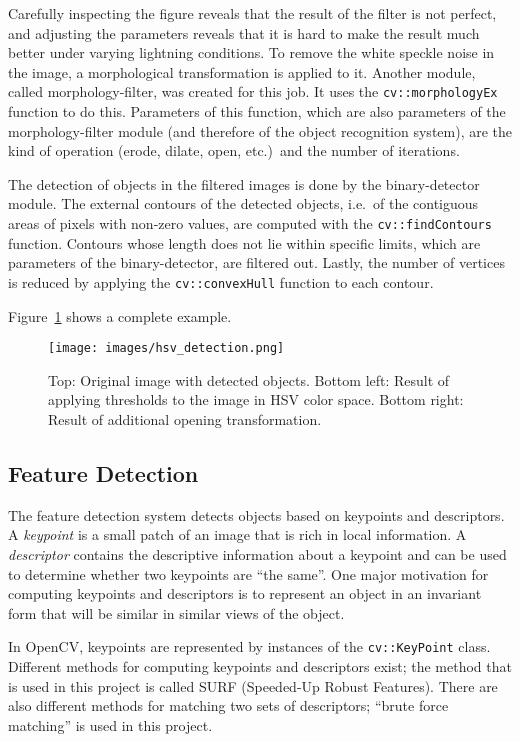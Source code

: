 \documentclass{article}
\newcommand{\code}[1]{\texttt{#1}}
\begin{document}
Carefully inspecting the figure reveals that the result of the filter is not perfect,
and adjusting the parameters reveals
that it is hard to make the result much better under varying lightning conditions.
To remove the white speckle noise in the image,
a morphological transformation is applied to it.
Another module, called morphology-filter, was created for this job.
It uses the \code{cv::morphologyEx} function to do this.
Parameters of this function, which are also parameters of the morphology-filter module
(and therefore of the object recognition system),
are the kind of operation (erode, dilate, open, etc.)\ and the number of iterations.

The detection of objects in the filtered images is done by the binary-detector
module.
The external contours of the detected objects,
i.e.\ of the contiguous areas of pixels with non-zero values,
are computed with the \code{cv::findContours} function.
Contours whose length does not lie within specific limits,
which are parameters of the binary-detector,
are filtered out.
Lastly, the number of vertices is reduced by applying the
\code{cv::convexHull} function to each contour.

Figure~\ref{fig:hsv_morph_bin} shows a complete example.
\begin{figure}
	\centering
	\texttt{[image: images/hsv\_detection.png]}
	\caption{Top: Original image with detected objects.
	Bottom left: Result of applying thresholds to the image in HSV color space.
	Bottom right: Result of additional opening transformation.}
	\label{fig:hsv_morph_bin}
\end{figure}



\subsection{Feature Detection}
\label{sec:feature_det}

The feature detection system detects objects based on keypoints and descriptors.
A \emph{keypoint} is a small patch of an image that is rich in local information.
A \emph{descriptor} contains the descriptive information about a keypoint and can be used
to determine whether two keypoints are ``the same''.
One major motivation for computing keypoints and descriptors is to represent an object in an
invariant form that will be similar in similar views of the
object.

In OpenCV, keypoints are represented by instances of the \code{cv::KeyPoint}
class.
Different methods for computing keypoints and descriptors exist;
the method that is used in this project is called SURF (Speeded-Up Robust Features).
There are also different methods for matching two sets of descriptors;
``brute force matching'' is used in this project.
\end{document}
